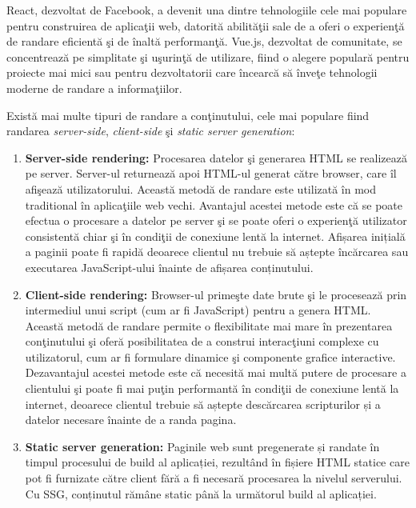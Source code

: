 \documentclass[12pt, a4paper]{report}
\begin{document}
React, dezvoltat de Facebook, a devenit una dintre tehnologiile cele mai populare pentru construirea de aplica\c tii web, datorit\u a abilit\u a\c tii sale de a oferi o experien\c t\u a de randare eficient\u a \c si de \^ inalt\u a performan\c t\u a. Vue.js, dezvoltat de comunitate, se concentreaz\u a pe simplitate \c si u\c surin\c t\u a de utilizare, fiind o alegere popular\u a pentru proiecte mai mici sau pentru dezvoltatorii care \^ incearc\u a s\u a \^ inve\c te tehnologii moderne de randare a informa\c tiilor.

Exist\u a mai multe tipuri de randare a con\c tinutului, cele mai populare fiind randarea \emph{server-side}, \emph{client-side} \c si  \emph{static server generation}: \cite{clientsidevssercerside}
\begin{enumerate}
	\item \textbf{Server-side rendering:} Procesarea datelor \c si generarea HTML se realizeaz\u a pe server. Server-ul returneaz\u a apoi HTML-ul generat c\u atre browser, care \^il afi\c seaz\u a utilizatorului. Aceast\u a metod\u a de randare este utilizat\u a \^in mod traditional \^in aplica\c tiile web vechi. Avantajul acestei metode este c\u a se poate efectua o procesare a datelor pe server \c si se poate oferi o experien\c t\u a utilizator consistent\u a chiar \c si \^in condi\c tii de conexiune lent\u a la internet. Afișarea inițială a paginii poate fi rapidă deoarece clientul nu trebuie să aștepte încărcarea sau executarea JavaScript-ului înainte de afișarea conținutului.
	\item \textbf{Client-side rendering:} Browser-ul prime\c ste date brute \c si le proceseaz\u a prin intermediul unui script (cum ar fi JavaScript) pentru a genera HTML. Aceast\u a metod\u a de randare permite o flexibilitate mai mare \^in prezentarea con\c tinutului \c si ofer\u a posibilitatea de a construi interac\c tiuni complexe cu utilizatorul, cum ar fi formulare dinamice \c si componente grafice interactive. Dezavantajul acestei metode este c\u a necesit\u a mai mult\u a putere de procesare a clientului \c si poate fi mai pu\c tin performant\u a \^in condi\c tii de conexiune lent\u a la internet, deoarece clientul trebuie să aștepte descărcarea scripturilor și a datelor necesare înainte de a randa pagina.
	\item \textbf{Static server generation:} Paginile web sunt pregenerate și randate în timpul procesului de build al aplicației, rezultând în fișiere HTML statice care pot fi furnizate către client fără a fi necesară procesarea la nivelul serverului. Cu SSG, conținutul rămâne static până la următorul build al aplicației.
\end{enumerate}
\end{document}
